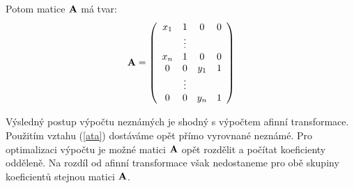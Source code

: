 Potom matice ${\bf A}$ má tvar:
\begin{eqnarray}\label{specA}
{\bf A}=
\left(
\begin{array}{cccc}
x_{1} & 1 & 0 & 0\\
& \vdots  &  & \\
x_{n} & 1 & 0 & 0\\
0     &  0 & y_{1} & 1\\
& \vdots  &  & \\
0 &  0 & y_{n} & 1\\
\end{array}
\right)
\end{eqnarray}

Výsledný postup výpočtu neznámých je shodný s výpočtem afinní transformace. 
Použitím vztahu (\ref{ata}) dostáváme opět přímo vyrovnané
neznámé. Pro optimalizaci výpočtu je možné matici ${\bf A}$ opět rozdělit a
počítat koeficienty odděleně. Na rozdíl od afinní transformace však
nedostaneme pro obě skupiny koeficientů stejnou matici ${\bf A}$.
